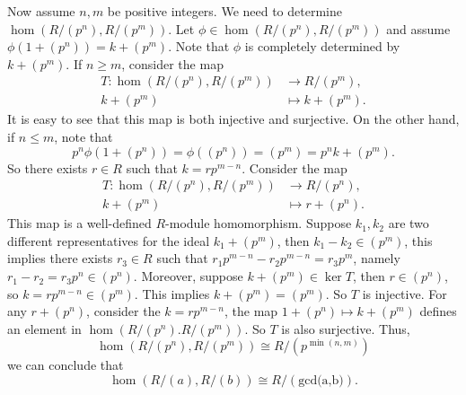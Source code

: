 \documentclass[a4paper, 12pt]{article}
\begin{document}
\begin{solution}
Now assume \(n,m\) be positive integers. We need to determine \(\hom (R/(p^n),R/(p^m))\). Let \(\phi\in \hom(R/(p^n),R/(p^m))\) and assume \(\phi(1+(p^n))=k+(p^m)\). Note that \(\phi\) is completely determined by \(k+(p^m)\). 
If \(n\geq m\), consider the map 
\begin{align*}
	T:\hom (R/(p^n),R/(p^m))&\rightarrow R/(p^m),\\ 
	                    k+(p^m)&\mapsto k+(p^m). 
\end{align*}
It is easy to see that this map is both injective and surjective. On the other hand, if \(n\leq m\), note that 
\[p^n\phi(1+(p^n))=\phi((p^n))=(p^m)=p^nk+(p^m).\]
So there exists \(r\in R\) such that \(k=rp^{m-n}\). 
Consider the map 
\begin{align*}
	T:\hom (R/(p^n),R/(p^m))&\rightarrow R/(p^n),\\ 
	                    k+(p^m)&\mapsto r+(p^n).
\end{align*}
This map is a well-defined \(R\)-module homomorphism. Suppose \(k_1,k_2\) are two different representatives for the ideal \(k_1+(p^m)\), then \(k_1-k_2\in (p^m)\), this implies there exists \(r_3\in R\) such that 
\(r_1p^{m-n}-r_2p^{m-n}=r_3p^m\), namely \(r_1-r_2=r_3p^n\in (p^n)\). Moreover, suppose \(k+(p^m)\in \ker T\), then \(r\in (p^n)\), so \(k=rp^{m-n}\in (p^m)\). This implies \(k+(p^m)=(p^m)\). So \(T\) is injective. For 
any \(r+(p^n)\), consider the \(k=rp^{m-n}\), the map \(1+(p^n)\mapsto k+(p^m)\) defines an element in \(\hom (R/(p^n).R/(p^m))\). So \(T\) is also surjective. Thus, 
\[\hom(R/(p^n),R/(p^m))\cong R/(p^{\min(n,m) })\]
we can conclude that 
\[\hom(R/(a),R/(b))\cong R/(\text{gcd(a,b)}).\]
\end{solution}
\end{document}
